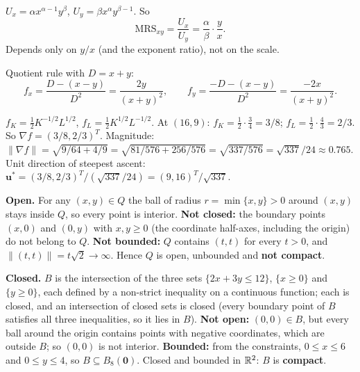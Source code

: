 \begin{solutions}
  \item $U_x=\alpha x^{\alpha-1}y^\beta$,
        $U_y=\beta x^\alpha y^{\beta-1}$. So
        \[
          \mathrm{MRS}_{xy}=\frac{U_x}{U_y}
            =\frac{\alpha}{\beta}\cdot\frac{y}{x} .
        \]
        Depends only on $y/x$ (and the exponent ratio), not on the
        scale. \checkmark

  \item Quotient rule with $D=x+y$:
        \[
          f_x=\frac{D-(x-y)}{D^2}=\frac{2y}{(x+y)^2}, \qquad
          f_y=\frac{-D-(x-y)}{D^2}=\frac{-2x}{(x+y)^2} .
        \]

  \item $f_K=\frac12K^{-1/2}L^{1/2}$, $f_L=\frac12K^{1/2}L^{-1/2}$. At
        $(16,9)$: $f_K=\frac12\cdot\frac34=3/8$;
        $f_L=\frac12\cdot\frac43=2/3$. So $\nabla f=(3/8,2/3)^T$.
        Magnitude:
        $\|\nabla f\|=\sqrt{9/64+4/9}=\sqrt{81/576+256/576}
        =\sqrt{337/576}=\sqrt{337}/24\approx0.765$. Unit direction of
        steepest ascent:
        $\mathbf{u}^*=(3/8,2/3)^T/(\sqrt{337}/24)=(9,16)^T/\sqrt{337}$.

  \item \textbf{Open.} For any $(x,y)\in Q$ the ball of radius
        $r=\min\{x,y\}>0$ around $(x,y)$ stays inside $Q$, so every
        point is interior. \textbf{Not closed:} the boundary points
        $(x,0)$ and $(0,y)$ with $x,y\ge0$ (the coordinate half-axes,
        including the origin) do not belong to $Q$. \textbf{Not
        bounded:} $Q$ contains $(t,t)$ for every $t>0$, and
        $\|(t,t)\|=t\sqrt2\to\infty$. Hence $Q$ is open, unbounded and
        \textbf{not compact}.

  \item \textbf{Closed.} $B$ is the intersection of the three sets
        $\{2x+3y\le12\}$, $\{x\ge0\}$ and $\{y\ge0\}$, each defined by
        a non-strict inequality on a continuous function; each is
        closed, and an intersection of closed sets is closed (every
        boundary point of $B$ satisfies all three inequalities, so it
        lies in $B$). \textbf{Not open:} $(0,0)\in B$, but every ball
        around the origin contains points with negative coordinates,
        which are outside $B$; so $(0,0)$ is not interior.
        \textbf{Bounded:} from the constraints, $0\le x\le6$ and
        $0\le y\le4$, so $B\subseteq B_8(\mathbf{0})$. Closed and
        bounded in $\mathbb{R}^2$: $B$ is \textbf{compact}.


\end{solutions}
